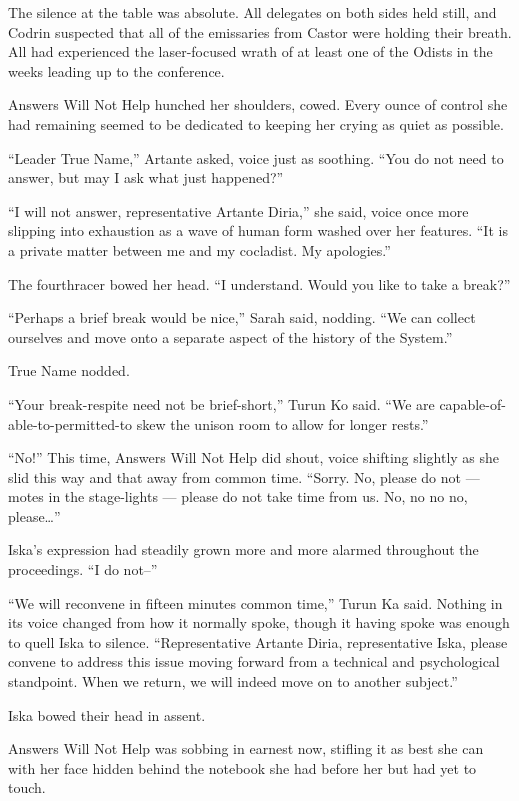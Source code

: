 The silence at the table was absolute. All delegates on both sides held still, and Codrin suspected that all of the emissaries from Castor were holding their breath. All had experienced the laser-focused wrath of at least one of the Odists in the weeks leading up to the conference.

Answers Will Not Help hunched her shoulders, cowed. Every ounce of control she had remaining seemed to be dedicated to keeping her crying as quiet as possible.

``Leader True Name,'' Artante asked, voice just as soothing. ``You do not need to answer, but may I ask what just happened?''

``I will not answer, representative Artante Diria,'' she said, voice once more slipping into exhaustion as a wave of human form washed over her features. ``It is a private matter between me and my cocladist. My apologies.''

The fourthracer bowed her head. ``I understand. Would you like to take a break?''

``Perhaps a brief break would be nice,'' Sarah said, nodding. ``We can collect ourselves and move onto a separate aspect of the history of the System.''

True Name nodded.

``Your break-respite need not be brief-short,'' Turun Ko said. ``We are capable-of-able-to-permitted-to skew the unison room to allow for longer rests.''

``No!'' This time, Answers Will Not Help did shout, voice shifting slightly as she slid this way and that away from common time. ``Sorry. No, please do not — motes in the stage-lights — please do not take time from us. No, no no no, please\ldots{}''

Iska's expression had steadily grown more and more alarmed throughout the proceedings. ``I do not--''

``We will reconvene in fifteen minutes common time,'' Turun Ka said. Nothing in its voice changed from how it normally spoke, though it having spoke was enough to quell Iska to silence. ``Representative Artante Diria, representative Iska, please convene to address this issue moving forward from a technical and psychological standpoint. When we return, we will indeed move on to another subject.''

Iska bowed their head in assent.

Answers Will Not Help was sobbing in earnest now, stifling it as best she can with her face hidden behind the notebook she had before her but had yet to touch.

